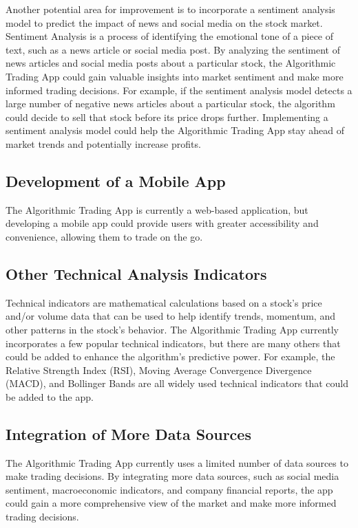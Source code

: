 Another potential area for improvement is to incorporate a sentiment analysis model to predict the impact of news and social media on the stock market. Sentiment Analysis is a process of identifying the emotional tone of a piece of text, such as a news article or social media post. By analyzing the sentiment of news articles and social media posts about a particular stock, the Algorithmic Trading App could gain valuable insights into market sentiment and make more informed trading decisions. For example, if the sentiment analysis model detects a large number of negative news articles about a particular stock, the algorithm could decide to sell that stock before its price drops further. Implementing a sentiment analysis model could help the Algorithmic Trading App stay ahead of market trends and potentially increase profits.

\subsection{Development of a Mobile App}

The Algorithmic Trading App is currently a web-based application, but developing a mobile app could provide users with greater accessibility and convenience, allowing them to trade on the go.

\subsection{Other Technical Analysis Indicators}

Technical indicators are mathematical calculations based on a stock's price and/or volume data that can be used to help identify trends, momentum, and other patterns in the stock's behavior. The Algorithmic Trading App currently incorporates a few popular technical indicators, but there are many others that could be added to enhance the algorithm's predictive power. For example, the Relative Strength Index (RSI), Moving Average Convergence Divergence (MACD), and Bollinger Bands are all widely used technical indicators that could be added to the app.

\subsection{Integration of More Data Sources}

The Algorithmic Trading App currently uses a limited number of data sources to make trading decisions. By integrating more data sources, such as social media sentiment, macroeconomic indicators, and company financial reports, the app could gain a more comprehensive view of the market and make more informed trading decisions.


